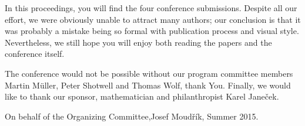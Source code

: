 \documentclass[a4paper,twocolumn,twoside,10pt]{book}
\begin{document}
In this proceedings, you will find the four conference
submissions. Despite all our effort, we were obviously unable to attract
many authors; our conclusion is that it was probably a mistake being so
formal with publication process and visual style. Nevertheless, we still
hope you will enjoy both reading the papers and the conference itself.

The conference would not be possible without our program committee members
Martin Müller, Peter Shotwell and Thomas Wolf, thank You. Finally,
we would like to thank our sponsor, mathematician and philanthropist
Karel Janeček.

\vspace*{2ex}
\noindent On behalf of the Organizing Committee,\newline Josef Moudřík,
Summer 2015.

\tableofcontents

\mainmatter

\cleardoublepage
{}


\cleardoublepage
{}


\cleardoublepage
{}


\cleardoublepage
{}

\end{document}
